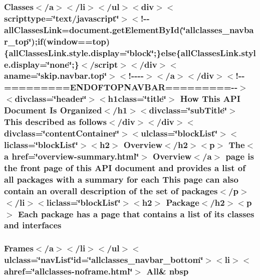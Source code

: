 \hypertarget{help-doc_8html_a63cecd3b472c3e6c88fcf57e81711dda}{
\subsubsection[{interfaces}]{\setlength{\rightskip}{0pt plus 5cm}Classes$<$/{\bf a}$>$$<$/li$>$$<$/ul$>$$<$div$>$$<$scripttype=\char`\"{}text/javascript\char`\"{}$>$$<$!-\/-\/all\-Classes\-Link=document.\-get\-Element\-By\-Id(\char`\"{}allclasses\-\_\-navbar\-\_\-top\char`\"{});if(window==top)\{all\-Classes\-Link.\-style.\-display=\char`\"{}block\char`\"{};\}else\{all\-Classes\-Link.\-style.\-display=\char`\"{}none\char`\"{};\}$<$/script$>$$<$/div$>$$<$aname=\char`\"{}skip.\-navbar.\-top\char`\"{}$>$$<$!-\/-\/-\/-\/$>$$<$/a$>$$<$/div$>$$<$!-\/-\/=========E\-N\-D\-O\-F\-T\-O\-P\-N\-A\-V\-B\-A\-R=========-\/-\/$>$$<$divclass=\char`\"{}header\char`\"{}$>$$<$h1class=\char`\"{}title\char`\"{}$>$ How This {\bf A\-P\-I} Document Is Organized$<$/h1$>$$<$divclass=\char`\"{}sub\-Title\char`\"{}$>$ This described as follows$<$/div$>$$<$/div$>$$<$divclass=\char`\"{}content\-Container\char`\"{}$>$$<$ulclass=\char`\"{}block\-List\char`\"{}$>$$<$liclass=\char`\"{}block\-List\char`\"{}$>$$<$h2$>$ Overview$<$/h2$>$$<$p$>$ The$<${\bf a} href=\char`\"{}overview-\/summary.\-html\char`\"{}$>$ Overview$<$/{\bf a}$>$ page is the front page of this {\bf A\-P\-I} document and provides {\bf a} list of all packages with {\bf a} summary for each This page can also contain an overall {\bf description} of the set of packages$<$/p$>$$<$/li$>$$<$liclass=\char`\"{}block\-List\char`\"{}$>$$<$h2$>$ Package$<$/h2$>$$<$p$>$ Each package has {\bf a} page that contains {\bf a} list of its classes and interfaces}}\label{help-doc_8html_a63cecd3b472c3e6c88fcf57e81711dda}
\hypertarget{help-doc_8html_af43198c3b54c4bc836554c5ac67d0f12}{
\subsubsection[{nbsp}]{\setlength{\rightskip}{0pt plus 5cm}Frames$<$/{\bf a}$>$$<$/li$>$$<$/ul$>$$<$ulclass=\char`\"{}nav\-List\char`\"{}id=\char`\"{}allclasses\-\_\-navbar\-\_\-bottom\char`\"{}$>$$<$li$>$$<$ahref=\char`\"{}allclasses-\/noframe.\-html\char`\"{}$>$ All\& nbsp}}\label{help-doc_8html_af43198c3b54c4bc836554c5ac67d0f12}
